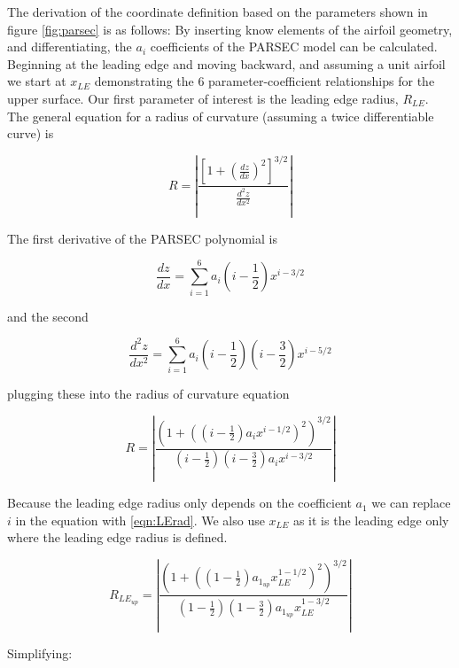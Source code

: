 The derivation of the coordinate definition based on the parameters shown in figure \ref{fig:parsec} is as follows: By inserting know elements of the airfoil geometry, and differentiating, the $a_i$ coefficients of the PARSEC model can be calculated.  Beginning at the leading edge and moving backward, and assuming a unit airfoil we start at $x_{LE}$ demonstrating the 6 parameter-coefficient relationships for the upper surface. Our first parameter of interest is the leading edge radius, $R_{LE}$. The general equation for a radius of curvature (assuming a twice differentiable curve) is

\begin{equation} 
\label{eqn:LErad}
R = \left| \frac{\left[1+\left(\frac{dz}{dx}\right)^2\right]^{3/2}}{\frac{d^2z}{dx^2}}\right| 
\end{equation}

The first derivative of the PARSEC polynomial is

\begin{equation} \frac{dz}{dx} = \sum_{i=1}^6 a_{i} \left(i-\frac{1}{2}\right) x^{i-3/2} \end{equation}

and the second

\begin{equation} \frac{d^2z}{dx^2} = \sum_{i=1}^6 a_{i} \left(i-\frac{1}{2}\right)\left(i-\frac{3}{2}\right) x^{i-5/2}  \end{equation}

plugging these into the radius of curvature equation

\begin{equation} 
R= \left| \frac{\left( 1+ \left(\left(i-\frac{1}{2}\right)a_i x^{i-1/2}\right)^2\right)^{3/2}}{\left(i-\frac{1}{2}\right) \left(i-\frac{3}{2}\right) a_i x^{i-3/2}} \right| 
\end{equation}

Because the leading edge radius only depends on the coefficient $a_1$ we can replace $i$ in the equation with \ref{eqn:LErad}.  We also use $x_{LE}$ as it is the leading edge only where the leading edge radius is defined.

\begin{equation} R_{LE_{up}}= \left| \frac{\left( 1+ \left(\left(1-\frac{1}{2}\right)a_{1_{up}} x_{LE}^{1-1/2}\right)^2\right)^{3/2}}{\left(1-\frac{1}{2}\right) \left(1-\frac{3}{2}\right) a_{1_{up}} x_{LE}^{1-3/2}} \right| \end{equation}

Simplifying:

